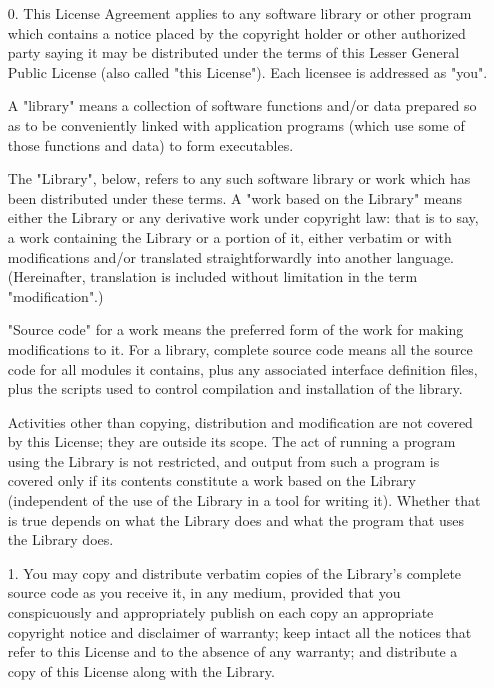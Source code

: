 {\small

  \begin{itemize}
  \item [0.] This License Agreement applies to any software library or
    other program which contains a notice placed by the copyright
    holder or other authorized party saying it may be distributed
    under the terms of this Lesser General Public License (also called
    "this License").  Each licensee is addressed as "you".
    
    A "library" means a collection of software functions and/or data
    prepared so as to be conveniently linked with application programs
    (which use some of those functions and data) to form executables.
    
    The "Library", below, refers to any such software library or work
    which has been distributed under these terms.  A "work based on
    the Library" means either the Library or any derivative work under
    copyright law: that is to say, a work containing the Library or a
    portion of it, either verbatim or with modifications and/or
    translated straightforwardly into another language.  (Hereinafter,
    translation is included without limitation in the term
    "modification".)
    
    "Source code" for a work means the preferred form of the work for
    making modifications to it.  For a library, complete source code
    means all the source code for all modules it contains, plus any
    associated interface definition files, plus the scripts used to
    control compilation and installation of the library.
    
    Activities other than copying, distribution and modification are
    not covered by this License; they are outside its scope.  The act
    of running a program using the Library is not restricted, and
    output from such a program is covered only if its contents
    constitute a work based on the Library (independent of the use of
    the Library in a tool for writing it).  Whether that is true
    depends on what the Library does and what the program that uses
    the Library does.
  
  \item [1.] You may copy and distribute verbatim copies of the
    Library's complete source code as you receive it, in any medium,
    provided that you conspicuously and appropriately publish on each
    copy an appropriate copyright notice and disclaimer of warranty;
    keep intact all the notices that refer to this License and to the
    absence of any warranty; and distribute a copy of this License
    along with the Library.
    

\end{itemize}}
